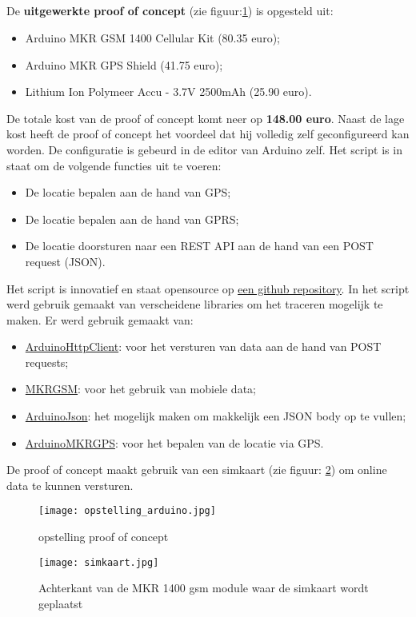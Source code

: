 \subsection{}
De \textbf{uitgewerkte proof of concept} (zie figuur:\ref{fig:opstelling_arduino}) is opgesteld uit:
\begin{itemize}
	\item Arduino MKR GSM 1400 Cellular Kit (80.35 euro);
	\item Arduino MKR GPS Shield (41.75 euro);
	\item Lithium Ion Polymeer Accu - 3.7V 2500mAh (25.90 euro).
\end{itemize}
De totale kost van de proof of concept komt neer op \textbf{148.00 euro}. Naast de lage kost heeft de proof of concept het voordeel dat hij volledig zelf geconfigureerd kan worden. De configuratie is gebeurd in de editor van Arduino zelf. Het script is in staat om de volgende functies uit te voeren:
\begin{itemize}
	\item De locatie bepalen aan de hand van GPS;
	\item De locatie bepalen aan de hand van GPRS;
	\item De locatie doorsturen naar een REST API aan de hand van een POST request (JSON).
\end{itemize}
Het script is innovatief en staat opensource op \underline{\href{https://github.com/IndyVC/bap-arduino}{een github repository}}. In het script werd gebruik gemaakt van verscheidene libraries om het traceren mogelijk te maken.
Er werd gebruik gemaakt van:
\begin{itemize}
	\item \href{https://github.com/arduino-libraries/ArduinoHttpClient}{ArduinoHttpClient}: voor het versturen van data aan de hand van POST requests;
	\item \href{https://github.com/arduino-libraries/MKRGSM}{MKRGSM}: voor het gebruik van mobiele data;
	\item \href{https://github.com/bblanchon/ArduinoJson}{ArduinoJson}: het mogelijk maken om makkelijk een JSON body op te vullen;
	\item \href{https://github.com/arduino-libraries/Arduino_MKRGPS}{ArduinoMKRGPS}: voor het bepalen van de locatie via GPS.
\end{itemize}
De proof of concept maakt gebruik van een simkaart (zie figuur: \ref{fig:simkaart}) om online data te kunnen versturen. 
\begin{figure}
	\texttt{[image: opstelling\_arduino.jpg]}
	\caption{opstelling proof of concept}
	\label{fig:opstelling_arduino}
\end{figure}
\begin{figure}
	\texttt{[image: simkaart.jpg]}
	\caption{Achterkant van de MKR 1400 gsm module waar de simkaart wordt geplaatst}
	\label{fig:simkaart}
\end{figure}
\pagebreak
